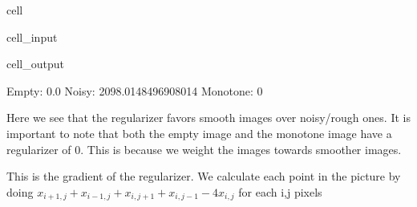 \documentclass[letterpaper,10pt,english]{jupyterBook}
\begin{document}
\begin{sphinxuseclass}{cell}\begin{sphinxVerbatimInput}

\begin{sphinxuseclass}{cell_input}
\begin{sphinxVerbatim}[commandchars=\\\{\}]
\end{sphinxVerbatim}

\end{sphinxuseclass}\end{sphinxVerbatimInput}
\begin{sphinxVerbatimOutput}

\begin{sphinxuseclass}{cell_output}
\begin{sphinxVerbatim}[commandchars=\\\{\}]
Empty: \PYGZhy{}0.0
Noisy: \PYGZhy{}2098.0148496908014
Monotone: 0
\end{sphinxVerbatim}

\end{sphinxuseclass}\end{sphinxVerbatimOutput}

\end{sphinxuseclass}
\sphinxAtStartPar
Here we see that the regularizer favors smooth images over noisy/rough ones. It is important to note that both the empty image and the monotone image have a regularizer of 0. This is because we weight the images towards smoother images.

\sphinxAtStartPar
This is the gradient of the regularizer.
We calculate each point in the picture by doing \(x_{i+1,j} + x_{i-1,j} + x_{i,j+1} + x_{i,j-1} - 4x_{i,j}\) for each i,j pixels
\end{document}
